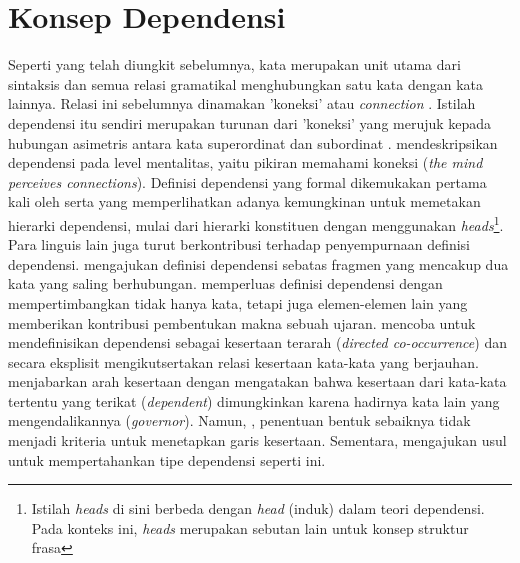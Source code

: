 \section{Konsep Dependensi}
Seperti yang telah diungkit sebelumnya, kata merupakan unit utama dari sintaksis dan semua relasi gramatikal menghubungkan satu kata dengan kata lainnya. Relasi ini sebelumnya dinamakan 'koneksi' atau \textit{connection} \citep{tesniere1959elements}. Istilah dependensi itu sendiri merupakan turunan dari 'koneksi' yang merujuk kepada hubungan asimetris antara kata superordinat dan subordinat \citep{hudson1984word}. \cite{tesniere1959elements} mendeskripsikan dependensi pada level mentalitas, yaitu pikiran memahami koneksi (\textit{the mind perceives connections}). Definisi dependensi yang formal dikemukakan pertama kali oleh \cite{lecerf1960programme} serta \cite{gladkij1966lekcii} yang memperlihatkan adanya kemungkinan untuk memetakan hierarki dependensi, mulai dari hierarki konstituen dengan menggunakan \textit{heads}\footnote{Istilah \textit{heads} di sini berbeda dengan \textit{head} (induk) dalam teori dependensi. Pada konteks ini, \textit{heads} merupakan sebutan lain untuk konsep struktur frasa}. Para linguis lain juga turut berkontribusi terhadap penyempurnaan definisi dependensi. \cite{mel'vcuk1988dependency} mengajukan definisi dependensi sebatas fragmen yang mencakup dua kata yang saling berhubungan. \cite{garde1977ordre} memperluas definisi dependensi dengan mempertimbangkan tidak hanya kata, tetapi juga elemen-elemen lain yang memberikan kontribusi pembentukan makna sebuah ujaran. \cite{schubert1987metataxis} mencoba untuk mendefinisikan dependensi sebagai kesertaan terarah (\textit{directed co-occurrence}) dan secara eksplisit mengikutsertakan relasi kesertaan kata-kata yang berjauhan. \cite{schubert1987metataxis} menjabarkan arah kesertaan dengan mengatakan bahwa kesertaan dari kata-kata tertentu yang terikat (\textit{dependent}) dimungkinkan karena hadirnya kata lain yang mengendalikannya (\textit{governor}). Namun, \cite{schubert1987metataxis}, penentuan bentuk sebaiknya tidak menjadi kriteria untuk menetapkan garis kesertaan. Sementara, \cite{hudson1994discontinuous} mengajukan usul untuk mempertahankan tipe dependensi seperti ini.

